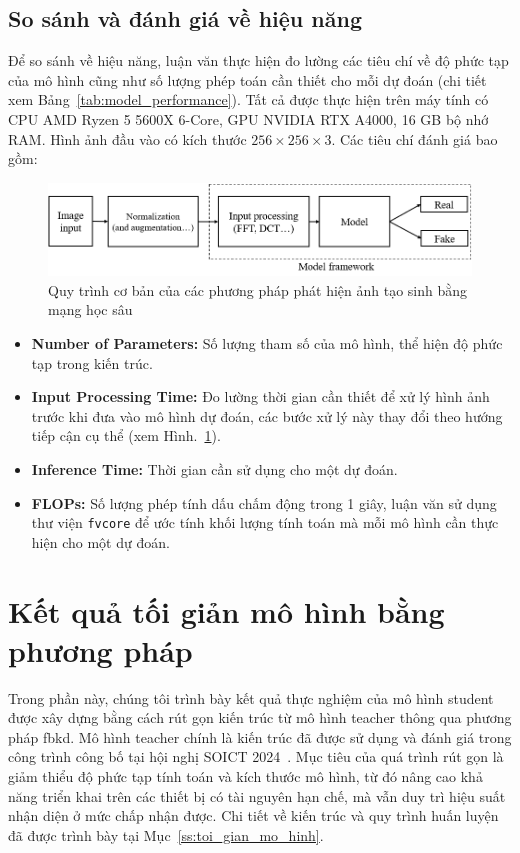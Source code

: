 \subsection{So sánh và đánh giá về hiệu năng}
%
%
Để so sánh về hiệu năng, luận văn thực hiện đo lường các tiêu chí về độ phức tạp của mô hình cũng như số lượng phép toán cần thiết cho mỗi dự đoán (chi tiết xem Bảng~\ref{tab:model_performance}). Tất cả được thực hiện trên máy tính có CPU AMD Ryzen 5 5600X 6-Core, GPU NVIDIA RTX A4000, 16 GB bộ nhớ RAM. Hình ảnh đầu vào có kích thước $256 \times 256 \times 3$. Các tiêu chí đánh giá bao gồm:
%
\begin{figure}[ht!]
	\includegraphics[width=\textwidth]{Images/figure_pine_line_1.png}
	\caption{Quy trình cơ bản của các phương pháp phát hiện ảnh tạo sinh bằng mạng học sâu}	
	\label{figure_pine_line_1}
\end{figure}
%
%
\begin{itemize}
	\item \textbf{Number of Parameters:} Số lượng tham số của mô hình, thể hiện độ phức tạp trong kiến trúc.
	\item \textbf{Input Processing Time:} Đo lường thời gian cần thiết để xử lý hình ảnh trước khi đưa vào mô hình dự đoán, các bước xử lý này thay đổi theo hướng tiếp cận cụ thể (xem Hình.~\ref{figure_pine_line_1}).
	\item \textbf{Inference Time:} Thời gian cần sử dụng cho một dự đoán.
	\item \textbf{FLOPs:} Số lượng phép tính dấu chấm động trong 1 giây, luận văn sử dụng thư viện \texttt{fvcore} để ước tính khối lượng tính toán mà mỗi mô hình cần thực hiện cho một dự đoán.
\end{itemize}
%
%



\section{Kết quả tối giản mô hình  bằng phương pháp }
%
Trong phần này, chúng tôi trình bày kết quả thực nghiệm của mô hình \gls{student} được xây dựng bằng cách rút gọn kiến trúc từ mô hình \gls{teacher} thông qua phương pháp \gls{fbkd}. Mô hình \gls{teacher} chính là kiến trúc đã được sử dụng và đánh giá trong công trình công bố tại hội nghị SOICT 2024~\cite{adof}. Mục tiêu của quá trình rút gọn là giảm thiểu độ phức tạp tính toán và kích thước mô hình, từ đó nâng cao khả năng triển khai trên các thiết bị có tài nguyên hạn chế, mà vẫn duy trì hiệu suất nhận diện ở mức chấp nhận được. Chi tiết về kiến trúc và quy trình huấn luyện đã được trình bày tại Mục~\ref{ss:toi_gian_mo_hinh}.


